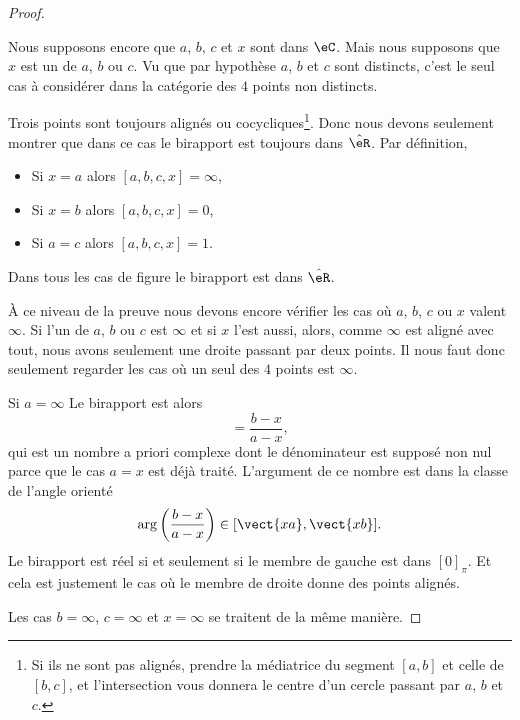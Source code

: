 \begin{proof}
\begin{subproof}
            Nous supposons encore que \( a\), \( b\), \( c\) et \( x\) sont dans \( \eC\). Mais nous supposons que \( x\) est un de \( a\), \( b\) ou \( c\). Vu que par hypothèse \( a\), \( b\) et \( c\) sont distincts, c'est le seul cas à considérer dans la catégorie des \( 4\) points non distincts.

            Trois points sont toujours alignés ou cocycliques\footnote{Si ils ne sont pas alignés, prendre la médiatrice du segment \( [a,b]\) et celle de \( [b,c]\), et l'intersection vous donnera le centre d'un cercle passant par \( a\), \( b\) et \( c\).}. Donc nous devons seulement montrer que dans ce cas le birapport est toujours dans \( \hat \eR\). Par définition,
            \begin{itemize}
                \item Si \( x=a\) alors \( [a,b,c,x]=\infty\),
                \item Si \( x=b\) alors \( [a,b,c,x]=0\),
                \item Si \( a=c\) alors \( [a,b,c,x]=1\).
            \end{itemize}
            Dans tous les cas de figure le birapport est dans \( \hat \eR\).

    \end{subproof}
    
    À ce niveau de la preuve nous devons encore vérifier les cas où \( a\), \( b\), \( c\) ou \( x\) valent \( \infty\). Si l'un de \( a\), \( b\) ou \( c\) est \( \infty\) et si \( x\) l'est aussi, alors, comme \( \infty\) est aligné avec tout, nous avons seulement une droite passant par deux points. Il nous faut donc seulement regarder les cas où un seul des \( 4\) points est \( \infty\).

    \begin{subproof}
        \item[Si \( a=\infty\)]
            Le birapport est alors
            \begin{equation}
                [\infty,b,c,x]=\frac{ b-x }{ a-x },
            \end{equation}
            qui est un nombre a priori complexe dont le dénominateur est supposé non nul parce que le cas \( a=x\) est déjà traité. L'argument de ce nombre est dans la classe de l'angle orienté
            \begin{equation}
                \arg\left( \frac{ b-x }{ a-x } \right)\in[\vect{ xa },\vect{ xb }].
            \end{equation}
            Le birapport est réel si et seulement si le membre de gauche est dans \( [0]_{\pi}\). Et cela est justement le cas où le membre de droite donne des points alignés.
    \end{subproof}
    Les cas \( b=\infty\), \( c=\infty\) et \( x=\infty\) se traitent de la même manière.
\end{proof}

